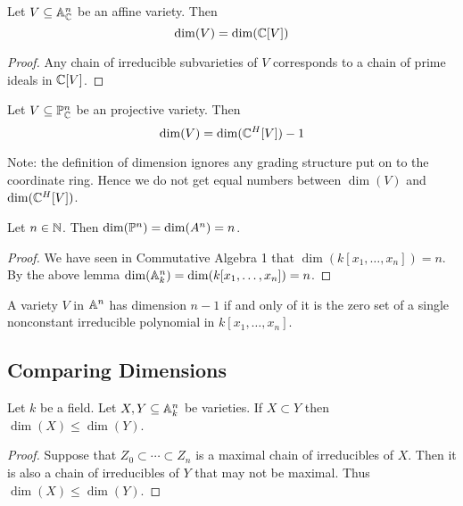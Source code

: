 \documentclass[a4paper]{article}
\begin{document}
\begin{prp}{}{} Let $V\subseteq\mathbb{A}_{\mathbb{C}}^n$ be an affine variety. Then $$\dim(V)=\dim(\mathbb{C}[V])$$ \tcbline
\begin{proof}
Any chain of irreducible subvarieties of $V$ corresponds to a chain of prime ideals in $\mathbb{C}[V]$. 
\end{proof}
\end{prp}

\begin{prp}{}{} Let $V\subseteq\mathbb{P}_{\mathbb{C}}^n$ be an projective variety. Then $$\dim(V)=\dim(\mathbb{C}^H[V])-1$$
\end{prp}

Note: the definition of dimension ignores any grading structure put on to the coordinate ring. Hence we do not get equal numbers between $\dim(V)$ and $\dim(\mathbb{C}^H[V])$. 

\begin{lmm}{}{} Let $n\in\mathbb{N}$. Then $\dim(\mathbb{P}^n)=\dim(A^n)=n$. \tcbline
\begin{proof}
We have seen in Commutative Algebra 1 that $\dim(k[x_1,\dots,x_n])=n$. By the above lemma $\dim(\mathbb{A}_k^n)=\dim(k[x_1,\dots,x_n])=n$. 
\end{proof}
\end{lmm}

\begin{prp}{}{} A variety $V$ in $\mathbb{A}^n$ has dimension $n-1$ if and only of it is the zero set of a single nonconstant irreducible polynomial in $k[x_1,\dots,x_n]$. 
\end{prp}

\subsection{Comparing Dimensions}
\begin{lmm}{}{} Let $k$ be a field. Let $X,Y\subseteq\mathbb{A}_k^n$ be varieties. If $X\subset Y$ then $\dim(X)\leq\dim(Y)$. \tcbline
\begin{proof}
Suppose that $Z_0\subset\cdots\subset Z_n$ is a maximal chain of irreducibles of $X$. Then it is also a chain of irreducibles of $Y$ that may not be maximal. Thus $\dim(X)\leq\dim(Y)$. 
\end{proof}
\end{lmm}
\end{document}
